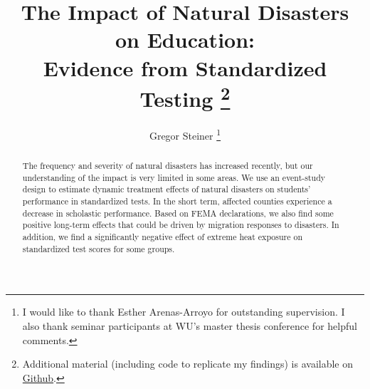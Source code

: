 \documentclass[11pt]{article}
\title{The Impact of Natural Disasters on Education: \\ Evidence from Standardized Testing \thanks{Additional material (including code to replicate my findings) is available on \href{https://github.com/gregorsteiner/MasterThesis}{Github}.}}
\author{Gregor Steiner \thanks{I would like to thank Esther Arenas-Arroyo for outstanding supervision. I also thank seminar participants at WU's master thesis conference for helpful comments.}}
\begin{document}
\maketitle
{}

\begin{abstract}
	\centering
	\begin{minipage}{\dimexpr\paperwidth-10cm}
		The frequency and severity of natural disasters has increased recently, but our understanding of the impact is very limited in some areas. We use an event-study design to estimate dynamic treatment effects of natural disasters on students' performance in standardized tests. In the short term, affected counties experience a decrease in scholastic performance. Based on FEMA declarations, we also find some positive long-term effects that could be driven by migration responses to disasters. In addition, we find a significantly negative effect of extreme heat exposure on standardized test scores for some groups.
	\end{minipage}
\end{abstract}

\newpage
\tableofcontents

\newpage












\appendix





\end{document}
